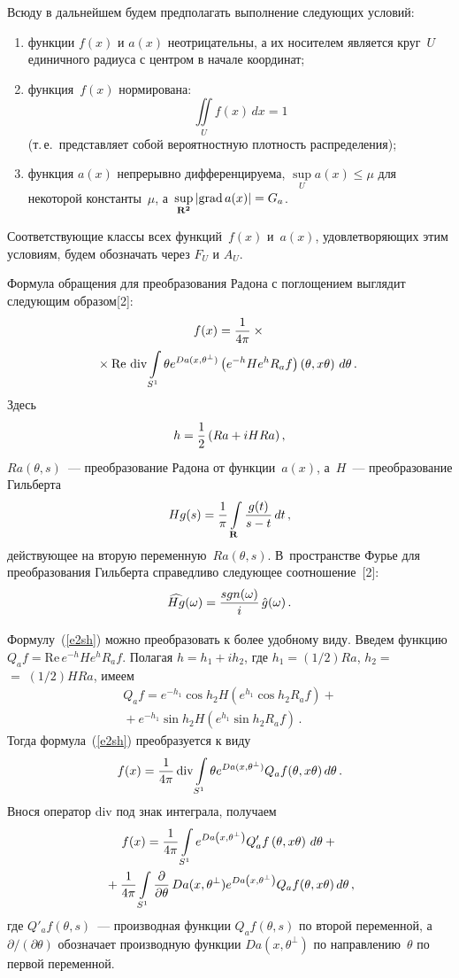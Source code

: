 \begin{multicols}{2}
Всюду в дальнейшем будем предполагать выполнение следующих условий:
\begin{enumerate}[(1)]
\item функции $f(x)$ и $a(x)$ неотрицательны, а их носителем является круг~$U$ единичного радиуса 
с центром в начале координат;
\item функция~$f(x)$ нормирована:
$$
\iint\limits_{U}f(x)\,dx=1
$$
(т.\,е.\ представляет собой вероятностную плотность распределения);
\item функция $a(x)$ непрерывно диф\-фе\-рен\-ци\-ру\-ема, $\sup\limits_{U}a(x)\leq\mu$ для некоторой константы~$\mu$, 
а~$\sup\limits_{\mathbf{R^2}}\left|\mbox{grad}\,a(x)\right|=G_a$.
\end{enumerate}

Соответствующие классы всех функций~$f(x)$ и~$a(x)$, удовлетворяющих этим условиям, будем обозначать через 
$F_U$ и $A_U$.

Формула обращения для преобразования Радона с поглощением выглядит следующим образом[2]:
\begin{multline}
f(x)=\displaystyle\frac{\displaystyle 1\mathstrut}{\displaystyle 4\pi\mathstrut}\times{}\\
\!\!\!\!{}\times 
\mathrm{Re}\ \mathrm{div}\int\limits_{S^1}\theta e^{Da(x,\theta^{\perp})}\left(
e^{-h}He^h R_af\right )\left (\theta,x\theta\right )\,d\theta\,.\!
\label{e2sh}
\end{multline}
Здесь 
$$
h=\displaystyle\frac{\displaystyle 1\mathstrut}{\displaystyle 2\mathstrut}\,(Ra+iHRa)\,,
$$ 
$Ra(\theta,s)$~--- преобразование Радона от функции~$a(x)$, а~$H$~--- преобразование Гильберта
$$
Hg(s)=\displaystyle\frac{\displaystyle 1\mathstrut}{\displaystyle \pi\mathstrut}\int\limits_{\mathbf{R}}\displaystyle\frac{\displaystyle g(t)\mathstrut}{\displaystyle s-t\mathstrut}\,dt\,,
$$ 
действующее на вторую переменную~$Ra(\theta,s)$.
В~пространстве Фурье для преобразования Гильберта справедливо следующее соотношение~[2]:
$$
\widehat{Hg}(\omega)=\displaystyle\frac{\displaystyle sgn(\omega)\mathstrut}{\displaystyle i\mathstrut}\,\hat{g}(\omega)\,.
$$

Формулу~(\ref{e2sh}) можно преобразовать к более удобному виду. 
Введем функцию $Q_af=\mathrm{Re}\, e^{-h}He^{h}R_af$. 
Полагая $h=h_1+ih_2$, где $h_1=(1/2)Ra$, $h_2=$\linebreak $=\;(1/2)HRa$, имеем
\begin{multline*}
Q_af=e^{-h_1}\cos{h_2}H(e^{h_1}\cos{h_2}R_af)+{}\\
{}+e^{-h_1}\sin{h_2}H(e^{h_1}\sin{h_2}R_af)\,.
\end{multline*}
Тогда формула~(\ref{e2sh}) преобразуется к виду
$$
f(x)=\displaystyle\frac{\displaystyle 1\mathstrut}{\displaystyle 4\pi\mathstrut}\,\mathrm{div}\int\limits_{S^1}\theta e^{Da(x,\theta^{\perp})}Q_af(\theta,x\theta)\,d\theta\,.
$$
Внося оператор div под знак интеграла, получаем
\begin{multline}
f(x)=\displaystyle\frac{\displaystyle 1\mathstrut}{\displaystyle 4\pi\mathstrut}\int\limits_{S^1}e^{Da\left (x,\theta^{\perp}\right )}Q'_af\left (\theta,x\theta\right )\,d\theta+{}\\
{}+\displaystyle\frac{\displaystyle 1\mathstrut}{\displaystyle 4\pi\mathstrut}\int\limits_{S^1}\displaystyle\frac{\displaystyle \partial\mathstrut}{\displaystyle \partial\theta\mathstrut}\,Da(x,\theta^{\perp})e^{Da\left ( x,\theta^{\perp}\right )}
Q_af(\theta,x\theta)\,d\theta\,,
\label{e3sh}
\end{multline}
где $Q'_af(\theta,s)$~--- производная функции $Q_af(\theta,s)$ по второй переменной, 
а~$\partial/(\partial\theta)$ обозначает производную функции $Da(x,\theta^{\perp})$ по направлению~$\theta$ 
по первой переменной.


\end{multicols}
